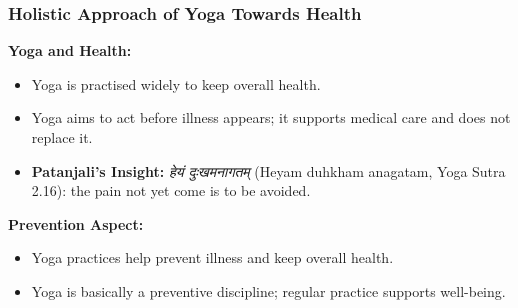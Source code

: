         



\begin{frame}[fragile]\frametitle{Holistic Approach of Yoga Towards Health}
    \textbf{Yoga and Health:}
    \begin{itemize}
        \item Yoga is practised widely to keep overall health.
        \item Yoga aims to act before illness appears; it supports medical care and does not replace it.
        \item \textbf{Patanjali's Insight:} \textit{हेयं दुःखमनागतम्} (Heyam duhkham anagatam, Yoga Sutra 2.16): the pain not yet come is to be avoided.
    \end{itemize}

    \textbf{Prevention Aspect:}
    \begin{itemize}
        \item Yoga practices help prevent illness and keep overall health.
        \item Yoga is basically a preventive discipline; regular practice supports well-being.
    \end{itemize}
\end{frame}


